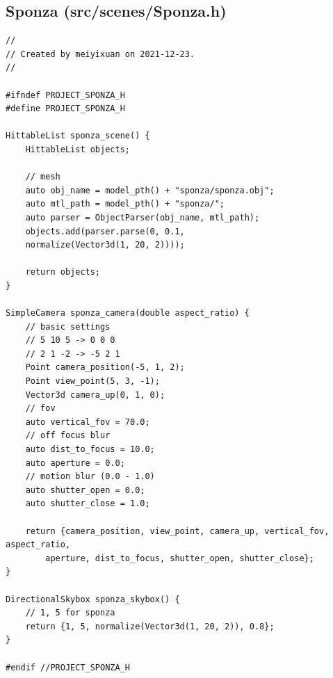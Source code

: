 \documentclass[utf8]{article}
\begin{document}
\subsection{Sponza (src/scenes/Sponza.h)}
\begin{lstlisting}[style=CStyle]
//
// Created by meiyixuan on 2021-12-23.
//

#ifndef PROJECT_SPONZA_H
#define PROJECT_SPONZA_H

HittableList sponza_scene() {
	HittableList objects;
	
	// mesh
	auto obj_name = model_pth() + "sponza/sponza.obj";
	auto mtl_path = model_pth() + "sponza/";
	auto parser = ObjectParser(obj_name, mtl_path);
	objects.add(parser.parse(0, 0.1,
	normalize(Vector3d(1, 20, 2))));
	
	return objects;
}

SimpleCamera sponza_camera(double aspect_ratio) {
	// basic settings
	// 5 10 5 -> 0 0 0
	// 2 1 -2 -> -5 2 1
	Point camera_position(-5, 1, 2);
	Point view_point(5, 3, -1);
	Vector3d camera_up(0, 1, 0);
	// fov
	auto vertical_fov = 70.0;
	// off focus blur
	auto dist_to_focus = 10.0;
	auto aperture = 0.0;
	// motion blur (0.0 - 1.0)
	auto shutter_open = 0.0;
	auto shutter_close = 1.0;
	
	return {camera_position, view_point, camera_up, vertical_fov, aspect_ratio,
		aperture, dist_to_focus, shutter_open, shutter_close};
}

DirectionalSkybox sponza_skybox() {
	// 1, 5 for sponza
	return {1, 5, normalize(Vector3d(1, 20, 2)), 0.8};
}

#endif //PROJECT_SPONZA_H

\end{lstlisting}
\end{document}

